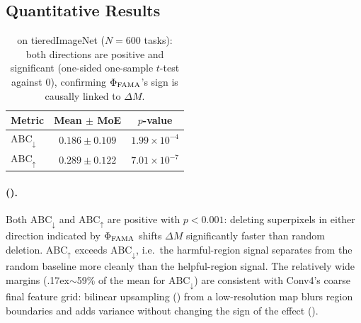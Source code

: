 \subsection{Quantitative Results}
\label{sec:quant_results}

\begin{table}[t]
\centering\small
\caption{\biadt on tieredImageNet ($N{=}600$ tasks): both directions are positive and significant (one-sided one-sample $t$-test against 0), confirming $\Phi_{\mathrm{FAMA}}$'s sign is causally linked to $\Delta M$.}
\label{tab:biadt}
\begin{tabular}{@{}lcc@{}}
\toprule
Metric & Mean $\pm$ MoE & $p$-value \\
\midrule
$\mathrm{ABC}_\downarrow$ & $0.186 \pm 0.109$ & $1.99{\times}10^{-4}$ \\
$\mathrm{ABC}_\uparrow$   & $0.289 \pm 0.122$ & $7.01{\times}10^{-7}$ \\
\bottomrule
\end{tabular}
\end{table}

\paragraph{\biadt ().} Both $\mathrm{ABC}_\downarrow$ and $\mathrm{ABC}_\uparrow$ are positive with $p<0.001$: deleting superpixels in either direction indicated by $\Phi_{\mathrm{FAMA}}$ shifts $\Delta M$ significantly faster than random deletion. $\mathrm{ABC}_\uparrow$ exceeds $\mathrm{ABC}_\downarrow$, i.e.\ the harmful-region signal separates from the random baseline more cleanly than the helpful-region signal. The relatively wide margins (\raise.17ex\hbox{$\scriptstyle\sim$}59\% of the mean for $\mathrm{ABC}_\downarrow$) are consistent with Conv4's coarse final feature grid: bilinear upsampling () from a low-resolution map blurs region boundaries and adds variance without changing the sign of the effect ().


